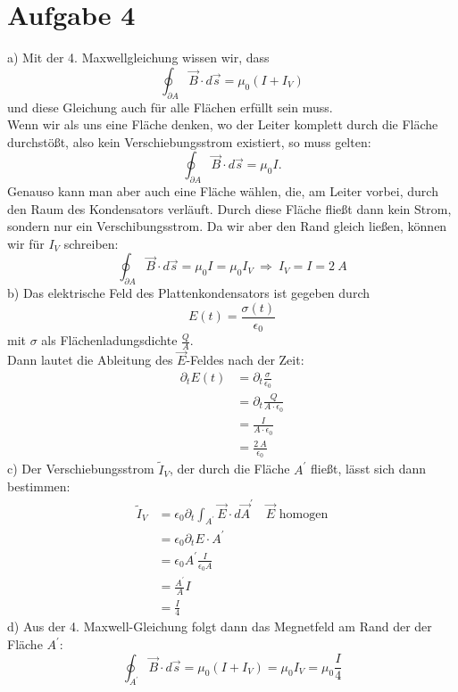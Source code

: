 \documentclass[11pt a4paper]{article}
\newcommand{\delt}{\partial_t}
\newcommand{\epsz}{\epsilon_0}
\newcommand{\del}{\partial}
\begin{document}
\section*{Aufgabe 4}
a) Mit der 4. Maxwellgleichung wissen wir, dass 
\[ \oint_{\del A} \vec B \cdot d\vec s = \mu_0 (I + I_V) \]
und diese Gleichung auch für alle Flächen erfüllt sein muss. \\
Wenn wir als uns eine Fläche denken, wo der Leiter komplett durch die Fläche durchstößt, also kein 
Verschiebungsstrom existiert, so muss gelten:
\[ \oint_{\del A} \vec B \cdot d\vec s = \mu_0 I. \]
Genauso kann man aber auch eine Fläche wählen, die, am Leiter vorbei, durch den Raum des Kondensators verläuft.
Durch diese Fläche fließt dann kein Strom, sondern nur ein Verschibungsstrom. Da wir aber den Rand gleich ließen, 
können wir für $I_V$ schreiben:
\[ \oint_{\del A} \vec B \cdot d \vec s = \mu_0 I = \mu_0 I_V \ \Rightarrow \ I_V = I = 2 \ A \]
b) Das elektrische Feld des Plattenkondensators ist gegeben durch
\[ E(t) = \frac{\sigma(t)}{\epsz} \] 
mit $\sigma$ als Flächenladungsdichte $\frac{Q}{A}$. \\
Dann lautet die Ableitung des $\vec E$-Feldes nach der Zeit:
\begin{align*}
	\delt E(t) 
	&= \delt \frac{\sigma}{\epsz} \\
	&= \delt \frac{Q}{A \cdot \epsz} \\
	&= \frac{I}{A \cdot \epsz} \\
	&= \frac{2 \ A}{\epsz}
\end{align*}
c) Der Verschiebungsstrom $\tilde{I}_V$, der durch die Fläche $A^\prime$ fließt, lässt sich dann bestimmen:
\begin{align*}
	\tilde{I}_V
	&= \epsz \delt \int_{A^\prime} \vec E \cdot d \vec A^\prime \quad 
	\vec E \text{ homogen} \\
	&= \epsz \delt E \cdot A^\prime \\
	&= \epsz A^\prime \frac{I}{\epsz A} \\
	&= \frac{A^\prime}{A} I \\
	&= \frac{I}{4}
\end{align*}
d) Aus der 4. Maxwell-Gleichung folgt dann das Megnetfeld am Rand der der Fläche $A^\prime$:
\[ \oint_{A^\prime} \vec B \cdot d\vec s = \mu_0 (I + I_V) = \mu_0 I_V = \mu_0 \frac{I}{4} \]

\newpage
\end{document}
